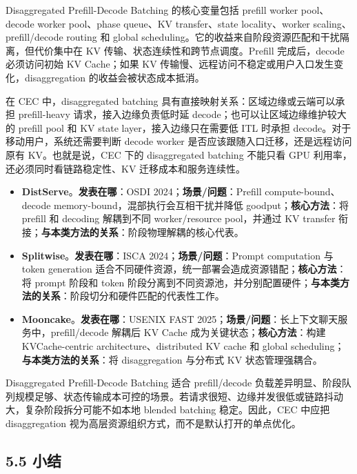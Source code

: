 \documentclass[a4paper,twocolumn,10pt]{ctexart}
\begin{document}
Disaggregated Prefill-Decode Batching 的核心变量包括 prefill worker pool、decode worker pool、phase queue、KV transfer、state locality、worker scaling、prefill/decode routing 和 global scheduling。它的收益来自阶段资源匹配和干扰隔离，但代价集中在 KV 传输、状态连续性和跨节点调度。Prefill 完成后，decode 必须访问初始 KV Cache；如果 KV 传输慢、远程访问不稳定或用户入口发生变化，disaggregation 的收益会被状态成本抵消。


在 CEC 中，disaggregated batching 具有直接映射关系：区域边缘或云端可以承担 prefill-heavy 请求，接入边缘负责低时延 decode；也可以让区域边缘维护较大的 prefill pool 和 KV state layer，接入边缘只在需要低 ITL 时承担 decode。对于移动用户，系统还需要判断 decode worker 是否应该跟随入口迁移，还是远程访问原有 KV。也就是说，CEC 下的 disaggregated batching 不能只看 GPU 利用率，还必须同时看链路稳定性、KV 迁移成本和服务连续性。



\begin{itemize}
\item \textbf{DistServe}。\textbf{发表在哪}：OSDI 2024；\textbf{场景/问题}：Prefill compute-bound、decode memory-bound，混部执行会互相干扰并降低 goodput；\textbf{核心方法}：将 prefill 和 decoding 解耦到不同 worker/resource pool，并通过 KV transfer 衔接；\textbf{与本类方法的关系}：阶段物理解耦的核心代表。
\item \textbf{Splitwise}。\textbf{发表在哪}：ISCA 2024；\textbf{场景/问题}：Prompt computation 与 token generation 适合不同硬件资源，统一部署会造成资源错配；\textbf{核心方法}：将 prompt 阶段和 token 阶段分离到不同资源池，并分别配置硬件；\textbf{与本类方法的关系}：阶段切分和硬件匹配的代表性工作。
\item \textbf{Mooncake}。\textbf{发表在哪}：USENIX FAST 2025；\textbf{场景/问题}：长上下文聊天服务中，prefill/decode 解耦后 KV Cache 成为关键状态；\textbf{核心方法}：构建 KVCache-centric architecture、distributed KV cache 和 global scheduling；\textbf{与本类方法的关系}：将 disaggregation 与分布式 KV 状态管理强耦合。
\end{itemize}





Disaggregated Prefill-Decode Batching 适合 prefill/decode 负载差异明显、阶段队列规模足够、状态传输成本可控的场景。若请求很短、边缘并发很低或链路抖动大，复杂阶段拆分可能不如本地 blended batching 稳定。因此，CEC 中应把 disaggregation 视为高层资源组织方式，而不是默认打开的单点优化。


\subsection{5.5 小结}
\end{document}
